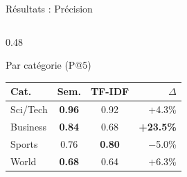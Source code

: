 \documentclass[aspectratio=169, 10pt]{beamer}
\begin{document}
\begin{frame}{R\'{e}sultats : Pr\'{e}cision}
\begin{columns}[T]
\begin{column}{0.48\textwidth}
\begin{block}{Par cat\'{e}gorie (P@5)}
        \footnotesize
        \begin{tabular}{@{}lccr@{}}
          \toprule
          \textbf{Cat.} & \textbf{Sem.} & \textbf{TF-IDF} & \textbf{$\Delta$} \\
          \midrule
          Sci/Tech  & \textbf{0.96} & 0.92 & +4.3\% \\
          Business  & \textbf{0.84} & 0.68 & \textbf{+23.5\%} \\
          Sports    & 0.76 & \textbf{0.80} & $-$5.0\% \\
          World     & \textbf{0.68} & 0.64 & +6.3\% \\
          \bottomrule
        \end{tabular}
      \end{block}
    \end{column}
  \end{columns}
\end{frame}
\end{document}
